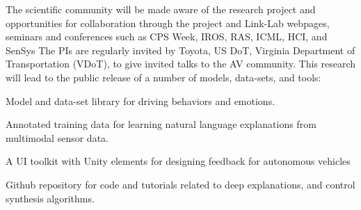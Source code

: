 \newline
{}%
The scientific community will be made aware of the research project and opportunities for collaboration through the project and Link-Lab webpages, seminars and conferences such as CPS Week, IROS, RAS, ICML, HCI, and SenSys
The PIs are regularly invited by Toyota, US DoT, Virginia Department of Transportation (VDoT), to give invited talks to the AV community.
This research will lead to the public release of a number of models, data-sets, and tools:
\begin{enumerate*}
    \item Model and data-set library for driving behaviors and emotions. 
    \item Annotated training data for learning natural language explanations from multimodal sensor data.
    \item A UI toolkit with Unity elements for designing feedback for autonomous vehicles
    \item Github repository for code and tutorials related to deep explanations, and control synthesis algorithms. 
\end{enumerate*}
